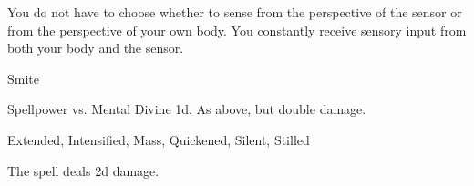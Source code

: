 You do not have to choose whether to sense from the perspective of the sensor or from the perspective of your own body.
You constantly receive sensory input from both your body and the sensor.
\begin{spellsection}{Smite}
\begin{spellheader}
\end{spellheader}
\begin{spellcontent}
\begin{spelltargetinginfo}
\end{spelltargetinginfo}
\begin{spelleffects}
\begin{spellattack}{Spellpower vs. Mental}
\spellsuccess Divine  \plus1d.
\spellcritical As above, but double damage.
\end{spellattack}
\end{spelleffects}
\end{spellcontent}
\begin{spellfooter}
 Extended, Intensified, Mass, Quickened, Silent, Stilled
\end{spellfooter}
\begin{spellsubcontent}
\begin{spellcantrip}
The spell deals \minus2d damage.
\end{spellcantrip}
\end{spellsubcontent}
\end{spellsection}

